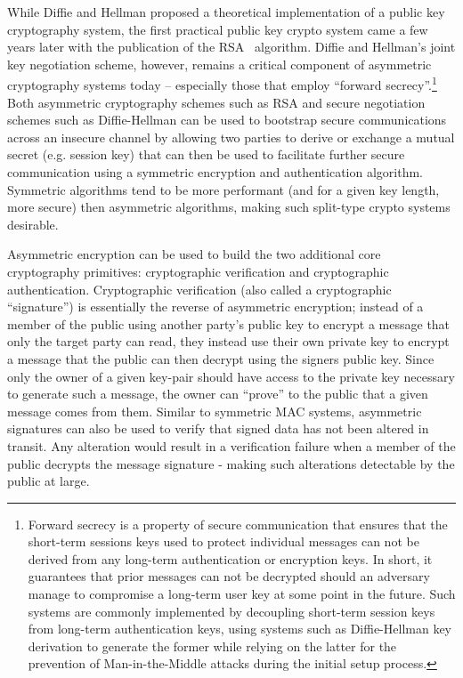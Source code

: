 While Diffie and Hellman proposed a theoretical implementation of a
public key cryptography system, the first practical public key crypto
system came a few years later with the publication of the
RSA~\cite{rivest1978} algorithm. Diffie and Hellman's joint key
negotiation scheme, however, remains a critical component of
asymmetric cryptography systems today -- especially those that employ
``forward secrecy''.\footnote{Forward secrecy is a property of secure
  communication that ensures that the short-term sessions keys used to
  protect individual messages can not be derived from any long-term
  authentication or encryption keys. In short, it guarantees that
  prior messages can not be decrypted should an adversary manage to
  compromise a long-term user key at some point in the future. Such
  systems are commonly implemented by decoupling short-term session
  keys from long-term authentication keys, using systems such as
  Diffie-Hellman key derivation to generate the former while relying
  on the latter for the prevention of Man-in-the-Middle attacks during
  the initial setup process.} Both asymmetric cryptography schemes
such as RSA and secure negotiation schemes such as Diffie-Hellman can
be used to bootstrap secure communications across an insecure channel
by allowing two parties to derive or exchange a mutual secret
(e.g. session key) that can then be used to facilitate further secure
communication using a symmetric encryption and authentication
algorithm. Symmetric algorithms tend to be more performant (and for a
given key length, more secure) then asymmetric algorithms, making such
split-type crypto systems desirable.

Asymmetric encryption can be used to build the two additional core
cryptography primitives: cryptographic verification and cryptographic
authentication. Cryptographic verification (also called a
cryptographic ``signature'') is essentially the reverse of asymmetric
encryption; instead of a member of the public using another party's
public key to encrypt a message that only the target party can read,
they instead use their own private key to encrypt a message that the
public can then decrypt using the signers public key. Since only the
owner of a given key-pair should have access to the private key
necessary to generate such a message, the owner can ``prove'' to the
public that a given message comes from them. Similar to symmetric MAC
systems, asymmetric signatures can also be used to verify that signed
data has not been altered in transit. Any alteration would result in a
verification failure when a member of the public decrypts the message
signature - making such alterations detectable by the public at large.

